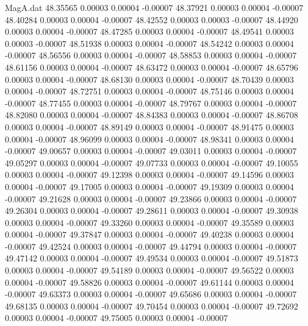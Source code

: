 \begin{filecontents}{MagA.dat}
  48.35565    0.00003    0.00004   -0.00007
  48.37921    0.00003    0.00004   -0.00007
  48.40284    0.00003    0.00004   -0.00007
  48.42552    0.00003    0.00003   -0.00007
  48.44920    0.00003    0.00004   -0.00007
  48.47285    0.00003    0.00004   -0.00007
  48.49541    0.00003    0.00003   -0.00007
  48.51938    0.00003    0.00004   -0.00007
  48.54242    0.00003    0.00004   -0.00007
  48.56556    0.00003    0.00004   -0.00007
  48.58853    0.00003    0.00004   -0.00007
  48.61156    0.00003    0.00004   -0.00007
  48.63472    0.00003    0.00004   -0.00007
  48.65796    0.00003    0.00004   -0.00007
  48.68130    0.00003    0.00004   -0.00007
  48.70439    0.00003    0.00004   -0.00007
  48.72751    0.00003    0.00004   -0.00007
  48.75146    0.00003    0.00004   -0.00007
  48.77455    0.00003    0.00004   -0.00007
  48.79767    0.00003    0.00004   -0.00007
  48.82080    0.00003    0.00004   -0.00007
  48.84383    0.00003    0.00004   -0.00007
  48.86708    0.00003    0.00004   -0.00007
  48.89149    0.00003    0.00004   -0.00007
  48.91475    0.00003    0.00004   -0.00007
  48.96099    0.00003    0.00004   -0.00007
  48.98341    0.00003    0.00004   -0.00007
  49.00657    0.00003    0.00004   -0.00007
  49.03011    0.00003    0.00004   -0.00007
  49.05297    0.00003    0.00004   -0.00007
  49.07733    0.00003    0.00004   -0.00007
  49.10055    0.00003    0.00004   -0.00007
  49.12398    0.00003    0.00004   -0.00007
  49.14596    0.00003    0.00004   -0.00007
  49.17005    0.00003    0.00004   -0.00007
  49.19309    0.00003    0.00004   -0.00007
  49.21628    0.00003    0.00004   -0.00007
  49.23866    0.00003    0.00004   -0.00007
  49.26304    0.00003    0.00004   -0.00007
  49.28611    0.00003    0.00004   -0.00007
  49.30938    0.00003    0.00004   -0.00007
  49.33260    0.00003    0.00004   -0.00007
  49.35589    0.00003    0.00004   -0.00007
  49.37847    0.00003    0.00004   -0.00007
  49.40238    0.00003    0.00004   -0.00007
  49.42524    0.00003    0.00004   -0.00007
  49.44794    0.00003    0.00004   -0.00007
  49.47142    0.00003    0.00004   -0.00007
  49.49534    0.00003    0.00004   -0.00007
  49.51873    0.00003    0.00004   -0.00007
  49.54189    0.00003    0.00004   -0.00007
  49.56522    0.00003    0.00004   -0.00007
  49.58826    0.00003    0.00004   -0.00007
  49.61144    0.00003    0.00004   -0.00007
  49.63373    0.00003    0.00004   -0.00007
  49.65686    0.00003    0.00004   -0.00007
  49.68135    0.00003    0.00004   -0.00007
  49.70454    0.00003    0.00004   -0.00007
  49.72692    0.00003    0.00004   -0.00007
  49.75005    0.00003    0.00004   -0.00007

\end{filecontents}
